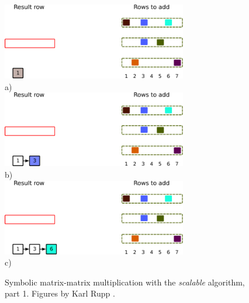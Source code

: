 \begin{figure}[H]
\centering
\includegraphics[width=0.72\textwidth]{scalable/spgemm-scalable-3}\\
a)\\
\vspace*{5mm}
\includegraphics[width=0.72\textwidth]{scalable/spgemm-scalable-4}\\
b)\\
\vspace*{5mm}
\includegraphics[width=0.72\textwidth]{scalable/spgemm-scalable-5}\\
c)\\
\vspace*{5mm}
\caption{Symbolic matrix-matrix multiplication with the \textit{scalable} algorithm, part 1. Figures by Karl Rupp \cite{karli_LANS_image}.}
\label{fig:spgemm-scalable_1}
\end{figure}


